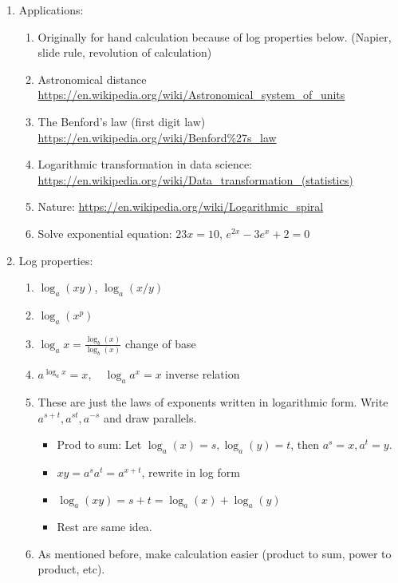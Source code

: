 \documentclass{article}
\begin{document}
\begin{enumerate}
\item Applications: 
\begin{enumerate}
\item Originally for hand calculation because of log properties below. (Napier, slide rule, revolution of calculation)
\item Astronomical distance \url{https://en.wikipedia.org/wiki/Astronomical_system_of_units}
\item The Benford's law (first digit law) \url{https://en.wikipedia.org/wiki/Benford%27s_law}
\item Logarithmic transformation in data science: \url{https://en.wikipedia.org/wiki/Data_transformation_(statistics)}
\item Nature: \url{https://en.wikipedia.org/wiki/Logarithmic_spiral}
\item Solve exponential equation: $2{3x}=10$, $e^{2x}-3e^x+2=0$
\end{enumerate}

\item Log properties:
\begin{enumerate}
\item $\log_a (xy)$, $\log_a(x/y)$
\item $\log_a (x^p)$
\item $\log_a x = \frac{\log_b(x)}{\log_b(x)}$ change of base
\item $a^{\log_a x} = x,\quad\log_a a^x = x$ inverse relation
\item These are just the laws of exponents written in logarithmic form. Write $a^{s+t}, a^{st}, a^{-s}$ and draw parallels.
\begin{itemize}
\item Prod to sum: Let $\log_a(x)=s, \log_a(y)=t$, then $a^s=x, a^t = y$.
\item $xy = a^sa^t = a^{x+t}$, rewrite in log form
\item $\log_a(xy) = s+t = \log_a(x)+\log_a(y)$
\item Rest are same idea.
\end{itemize}
\item As mentioned before, make calculation easier (product to sum, power to product, etc).
\end{enumerate}


\end{enumerate}
\end{document}
